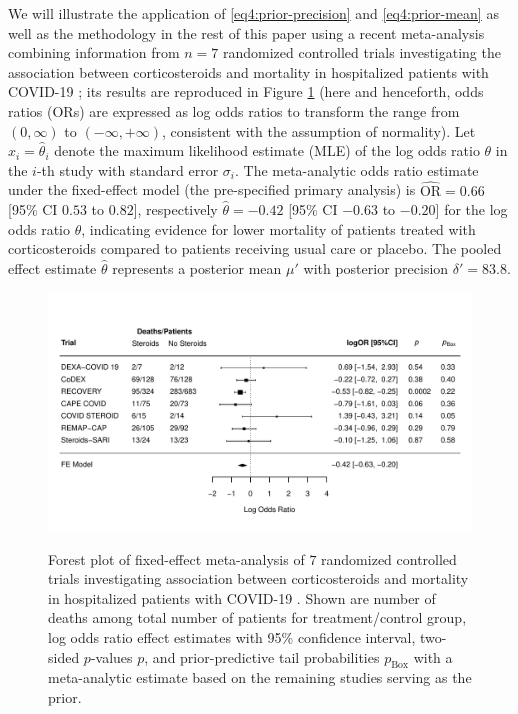 We will illustrate the application of \eqref{eq4:prior-precision} and
\eqref{eq4:prior-mean} as well as the methodology in the rest of this paper
using a recent meta-analysis combining information from $n=7$ randomized
controlled trials investigating the association between corticosteroids and
mortality in hospitalized patients with COVID-19 \citep{REACT2020}; its results
are reproduced in Figure \ref{fig4:covid19-meta} (here and henceforth, odds
ratios (ORs) are expressed as log odds ratios to transform the range from
$(0, \infty)$ to $(-\infty, +\infty)$, consistent with the assumption of
normality). Let $x_i = \hat \theta_i$ denote the maximum likelihood estimate
(MLE) of the log odds ratio $\theta$ in the $i$-th study with standard error
$\sigma_i$. The meta-analytic odds ratio estimate under the fixed-effect model
(the pre-specified primary analysis) is $\widehat{\text{OR}} = 0.66$ [95\% CI
$0.53$ to $0.82$], respectively $\hat \theta = -0.42$ [95\% CI $-0.63$ to
$-0.20$] for the log odds ratio $\theta$, indicating evidence for lower
mortality of patients treated with corticosteroids compared to patients
receiving usual care or placebo. The pooled effect estimate $\hat \theta$
represents a posterior mean $\mu'$ with posterior precision $\delta'=83.8$.


\begin{figure}[!htb]
\begin{knitrout}
\color{fgcolor}
{\centering \includegraphics[width=\maxwidth]{images/paper4/forest-plot-covid19-1}
}
\end{knitrout}
\caption{Forest plot of fixed-effect meta-analysis of $7$ randomized controlled
  trials investigating association between corticosteroids and mortality in
  hospitalized patients with COVID-19 \citep{REACT2020}. Shown are number of
  deaths among total number of patients for treatment/control group, log odds
  ratio effect estimates with 95\% confidence interval, two-sided $p$-values
  $p$, and prior-predictive tail probabilities $p_{\text{Box}}$ with a
  meta-analytic estimate based on the remaining studies serving as the prior.}
\label{fig4:covid19-meta}
\end{figure}




